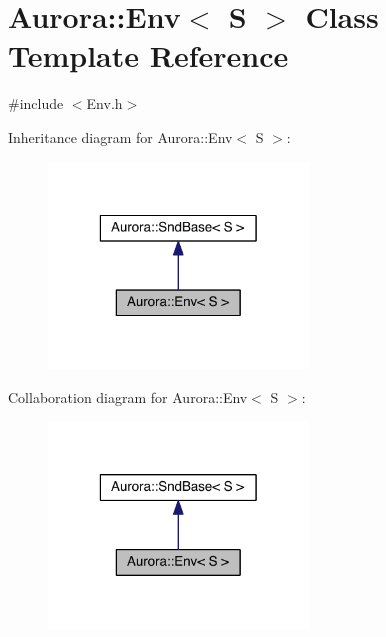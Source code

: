\hypertarget{class_aurora_1_1_env}{}\section{Aurora\+:\+:Env$<$ S $>$ Class Template Reference}
\label{class_aurora_1_1_env}


{\ttfamily \#include $<$Env.\+h$>$}



Inheritance diagram for Aurora\+:\+:Env$<$ S $>$\+:
\nopagebreak
\begin{figure}[H]
\begin{center}
\leavevmode
\includegraphics[width=196pt]{class_aurora_1_1_env__inherit__graph}
\end{center}
\end{figure}


Collaboration diagram for Aurora\+:\+:Env$<$ S $>$\+:
\nopagebreak
\begin{figure}[H]
\begin{center}
\leavevmode
\includegraphics[width=196pt]{class_aurora_1_1_env__coll__graph}
\end{center}
\end{figure}
